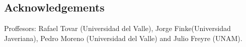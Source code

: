 \documentclass{bmcart}
\begin{document}
\begin{backmatter}



\section*{Acknowledgements}
  Proffesors: Rafael Tovar (Universidad del Valle), Jorge Finke(Universidad Javeriana), Pedro Moreno (Universidad del Valle) and Julio Freyre (UNAM).






\end{backmatter}
\end{document}
